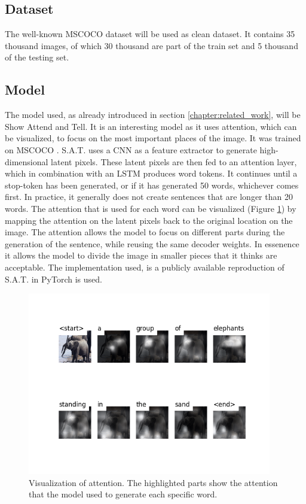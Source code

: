 \subsection{Dataset}
The well-known MSCOCO \cite{lin2015microsoft} dataset will be used as clean dataset. It contains 35 thousand images, of which 30 thousand are part of the train set and 5 thousand of the testing set.

\subsection{Model}
The model used, as already introduced in section \ref{chapter:related_work}, will be Show Attend and Tell. It is an interesting model as it uses attention, which can be visualized, to focus on the most important places of the image. It was trained on MSCOCO \cite{lin2015microsoft}. S.A.T. uses a CNN as a feature extractor to generate high-dimensional latent pixels. These latent pixels are then fed to an attention layer, which in combination with an LSTM produces word tokens. It continues until a stop-token has been generated, or if it has generated 50 words, whichever comes first. In practice, it generally does not create sentences that are longer than 20 words. The attention that is used for each word can be visualized (Figure \ref{fig:caption_elephant_clean}) by mapping the attention on the latent pixels back to the original location on the image. The attention allows the model to focus on different parts during the generation of the sentence, while reusing the same decoder weights. In essenence it allows the model to divide the image in smaller pieces that it thinks are acceptable. The implementation used, is a publicly available reproduction of S.A.T. in PyTorch \cite{NEURIPS2019_9015} is used. \cite{sgrvinod}

\begin{figure}[h]
    \centering
    \includegraphics[width=0.95\textwidth]{figures/caption_elephant_normal.png}
    \caption{Visualization of attention. The highlighted parts show the attention that the model used to generate each specific word.}
    \label{fig:caption_elephant_clean}
\end{figure}

